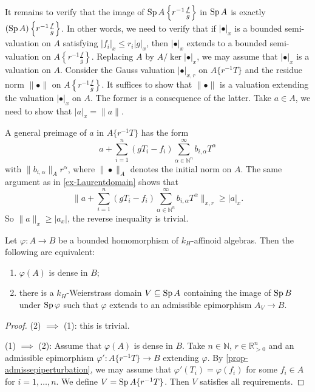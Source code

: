 \begin{example}
    It remains to verify that the image of $\operatorname{Sp} A\left\{r^{-1}\frac{f}{g}\right\}$ in $\operatorname{Sp} A$ is exactly $(\operatorname{Sp} A)\left\{r^{-1}\frac{f}{g}\right\}$. In other words, we need to verify that if $|\bullet|_x$ is a bounded semi-valuation on $A$ satisfying $|f_i|_x\leq r_i |g|_x$, then $|\bullet|_x$ extends to a bounded semi-valuation on   $A\left\{r^{-1}\frac{f}{g}\right\}$. 
    Replacing $A$ by $A/\ker |\bullet|_x$, we may assume that $|\bullet|_x$ is a valuation on $A$. Consider the Gauss valuation $|\bullet|_{x,r}$ on $A\{r^{-1}T\}$ and the residue norm $\|\bullet\|$ on $A\left\{r^{-1}\frac{f}{g}\right\}$. It suffices to show that $\|\bullet\|$ is a valuation extending the valuation $|\bullet|_x$ on $A$. The former is a consequence of the latter. Take $a\in A$, we need to show that $|a|_x=\|a\|$.

    A general preimage of $a$ in $A\{r^{-1}T\}$ has the form
    \[
        a+\sum_{i=1}^n(gT_i-f_i)\sum_{\alpha\in \mathbb{N}^n}^{\infty}b_{i,\alpha}T^{\alpha}
    \]
    with $\|b_{i,\alpha}\|_Ar^{\alpha}$, where $\|\bullet\|_A$ denotes the initial norm on $A$. The same argument as in \cref{ex-Laurentdomain} shows that 
    \[
        \|a+\sum_{i=1}^n(gT_i-f_i)\sum_{\alpha\in \mathbb{N}^n}^{\infty}b_{i,\alpha}T^{\alpha}\|_{x,r}\geq |a|_x.
    \]
    So $\|a\|_x\geq |a_x|$, the reverse inequality is trivial. 
\end{example}


\begin{proposition}\label{prop-Weirestrassdomainequivdense}
    Let $\varphi:A\rightarrow B$ be a bounded homomorphism of $k_H$-affinoid algebras. Then the following are equivalent:
    \begin{enumerate}
        \item $\varphi(A)$ is dense in $B$;
        \item there is a $k_H$-Weierstrass domain $V\subseteq \operatorname{Sp} A$ containing the image of $\operatorname{Sp} B$ under $\operatorname{Sp} \varphi$ such that $\varphi$ extends to an admissible epimorphism $A_V\rightarrow B$.
    \end{enumerate}
\end{proposition}
\begin{proof}
    (2) $\implies$ (1): this is trivial.

    (1) $\implies$ (2): Assume that $\varphi(A)$ is dense in $B$. Take $n\in \mathbb{N}$, $r\in \mathbb{R}^n_{>0}$ and an admissible epimorphism $\varphi':A\{r^{-1}T\}\rightarrow B$ extending $\varphi$. By \cref{prop-admissepiperturbation}, we may assume that $\varphi'(T_i)=\varphi(f_i)$ for some $f_i\in A$ for $i=1,\ldots,n$. We define $V=\operatorname{Sp} A\{r^{-1}T\}$. Then $V$ satisfies all requirements.
\end{proof}



